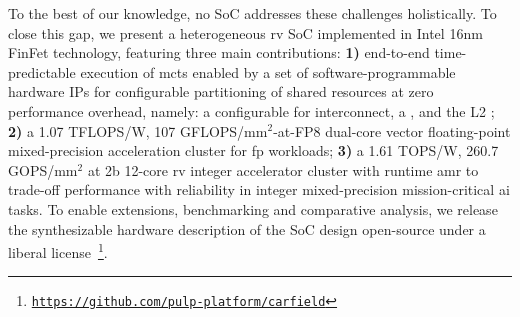 


To the best of our knowledge, no SoC addresses these challenges holistically. To close this gap, we present a heterogeneous \gls{rv} SoC implemented in Intel 16nm FinFet technology, featuring three main contributions: 
%
\textbf{1)} end-to-end time-predictable execution of \glspl{mct} enabled by a set of software-programmable hardware IPs for configurable partitioning of shared resources at zero performance overhead, namely: a configurable  for interconnect, a , and the L2 ; 
%
%
\textbf{2)} a 1.07 TFLOPS/W, 107 GFLOPS/mm$^2$-at-FP8 dual-core vector floating-point mixed-precision acceleration cluster for \gls{fp} workloads; 
%
\textbf{3)} a 1.61 TOPS/W, 260.7 GOPS/mm$^2$ at 2b 12-core \gls{rv} integer accelerator cluster with runtime \gls{amr} to trade-off performance with reliability in integer mixed-precision mission-critical \gls{ai} tasks. To enable extensions, benchmarking and comparative analysis, we release the synthesizable hardware description of the SoC design open-source under a liberal license~\footnote{\texttt{\url{https://github.com/pulp-platform/carfield}}}. %
